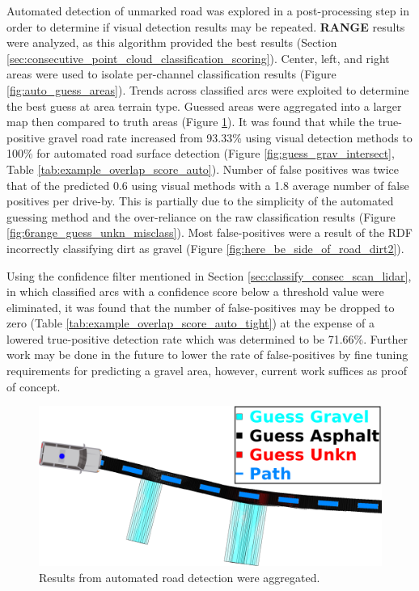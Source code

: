 \documentclass[numbered,pdftex]{ohio-etd}
\begin{document}
{{		{Automated detection of unmarked road was explored in a post-processing step in order to determine if visual detection results may be repeated. \textbf{RANGE} results were analyzed, as this algorithm provided the best results (Section \ref{sec:consecutive_point_cloud_classification_scoring}). Center, left, and right areas were used to isolate per-channel classification results (Figure \ref{fig:auto_guess_areas}). Trends across classified arcs were exploited to determine the best guess at area terrain type. Guessed areas were aggregated into a larger map then compared to truth areas (Figure \ref{fig:agreggated_auto_guess}). It was found that while the true-positive gravel road rate increased from 93.33\% using visual detection methods to 100\% for  automated road surface detection (Figure \ref{fig:guess_grav_intersect}, Table \ref{tab:example_overlap_score_auto}). Number of false positives was twice that of the predicted 0.6 using visual methods with a 1.8 average number of false positives per drive-by. This is partially due to the simplicity of the automated guessing method and the over-reliance on the raw classification results (Figure \ref{fig:6range_guess_unkn_misclass}). Most false-positives were a result of the RDF incorrectly classifying dirt as gravel (Figure \ref{fig:here_be_side_of_road_dirt2}).}
		
		{Using the confidence filter mentioned in Section \ref{sec:classify_consec_scan_lidar}, in which classified arcs with a confidence score below a threshold value were eliminated, it was found that the number of false-positives may be dropped to zero (Table \ref{tab:example_overlap_score_auto_tight}) at the expense of a lowered true-positive detection rate which was determined to be 71.66\%. Further work may be done in the future to lower the rate of false-positives by fine tuning requirements for predicting a gravel area, however, current work suffices as proof of concept.  }
		
		\begin{figure}[H]
			\centering
			\includegraphics[width=0.95\linewidth]{Defense_Images/db1_conf_elim_auto_guess_agg}
			\caption[Aggregated Automated Road Surface Detection]{Results from automated road detection were aggregated.}
			\label{fig:agreggated_auto_guess}
		\end{figure}
		
}}
\end{document}

